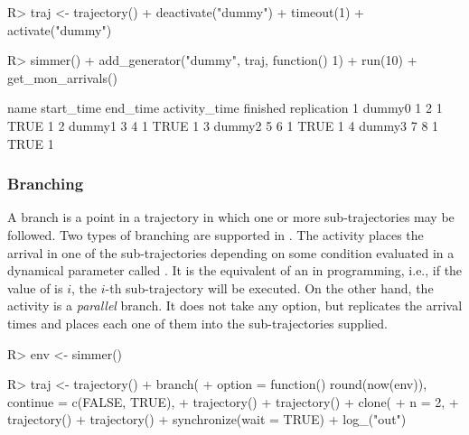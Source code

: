 \documentclass[
  nojss]{jss}
\begin{document}
\begin{CodeChunk}
\begin{CodeInput}
R> traj <- trajectory() %
+   deactivate("dummy") %
+   timeout(1) %
+   activate("dummy")
\end{CodeInput}
\end{CodeChunk}

\begin{CodeChunk}
\begin{CodeInput}
R> simmer() %
+   add_generator("dummy", traj, function() 1) %
+   run(10) %
+   get_mon_arrivals()
\end{CodeInput}
\begin{CodeOutput}
    name start_time end_time activity_time finished replication
1 dummy0          1        2             1     TRUE           1
2 dummy1          3        4             1     TRUE           1
3 dummy2          5        6             1     TRUE           1
4 dummy3          7        8             1     TRUE           1
\end{CodeOutput}
\end{CodeChunk}

\hypertarget{branching}{%
\subsubsection{Branching}\label{branching}}

A branch is a point in a trajectory in which one or more
sub-trajectories may be followed. Two types of branching are supported
in . The  activity places the arrival in one
of the sub-trajectories depending on some condition evaluated in a
dynamical parameter called . It is the equivalent of an
 in programming, i.e., if the value of  is
\(i\), the \(i\)-th sub-trajectory will be executed. On the other hand,
the  activity is a \emph{parallel} branch. It does not
take any option, but replicates the arrival  times and places
each one of them into the  sub-trajectories supplied.

\begin{CodeChunk}
\begin{CodeInput}
R> env <- simmer()
\end{CodeInput}
\end{CodeChunk}

\begin{CodeChunk}
\begin{CodeInput}
R> traj <- trajectory() %
+   branch(
+     option = function() round(now(env)), continue = c(FALSE, TRUE),
+     trajectory() %
+     trajectory() %
+   clone(
+     n = 2,
+     trajectory() %
+     trajectory() %
+   synchronize(wait = TRUE) %
+   log_("out")
\end{CodeInput}
\end{CodeChunk}
\end{document}
